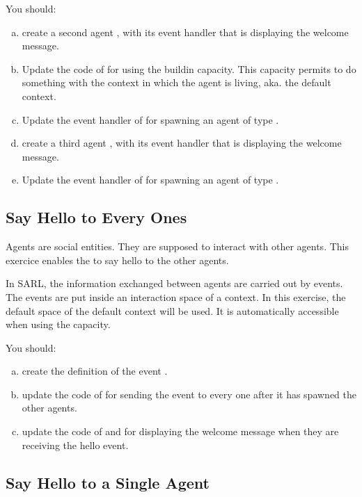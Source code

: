 \documentclass[article,english,nodocumentinfo]{multiagentfrreport}
\begin{document}
You should:
\begin{enumerate}[a)]
\item create a second agent , with its  event handler that is displaying the welcome message.
\item Update the code of  for using the  buildin capacity. This capacity permits to do something with the context in which the agent is living, aka. the default context.
\item Update the  event handler of  for spawning an agent of type .
\item create a third agent , with its  event handler that is displaying the welcome message.
\item Update the  event handler of  for spawning an agent of type .
\end{enumerate}

\subsection{Say Hello to Every Ones}

Agents are social entities. They are supposed to interact with other agents.
This exercice enables the  to say hello to the other agents.

In SARL, the information exchanged between agents are carried out by events.
The events are put inside an interaction space of a context.
In this exercise, the default space of the default context will be used.
It is automatically accessible when using the  capacity.

You should:
\begin{enumerate}[a)]
\item create the definition of the event .
\item update the code of  for sending the event to every one after it has spawned the other agents.
\item update the code of  and  for displaying the welcome message when they are receiving the hello event.
\end{enumerate}

\subsection{Say Hello to a Single Agent}
\end{document}
